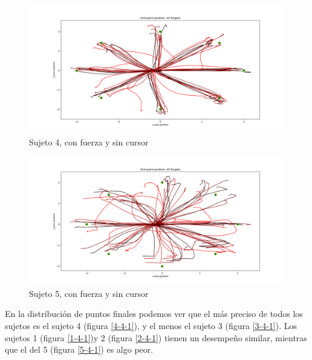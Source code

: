 \documentclass[a4paper,11pt, oneside]{book}
\begin{document}
\begin{figure}[H]
	\includegraphics[width=\linewidth]{sujeto4/force_no_cursor/trayectorias}
	\caption{Sujeto 4, con  fuerza y sin cursor}
	\label{4-4-0}
\end{figure}
\begin{figure}[H]
	\includegraphics[width=\linewidth]{sujeto5/force_no_cursor/trayectorias}
	\caption{Sujeto 5, con  fuerza y sin cursor}
	\label{5-4-0}
\end{figure}


En la distribución de puntos finales podemos ver que el más preciso de todos los sujetos es el sujeto 4 (figura \ref{4-4-1}), y el menos el sujeto 3 (figura \ref{3-4-1}). Los sujetos 1 (figura \ref{1-4-1})y 2 (figura \ref{2-4-1}) tienen un desempeño similar, mientras que el del 5 (figura \ref{5-4-1}) es algo peor.
\end{document}
